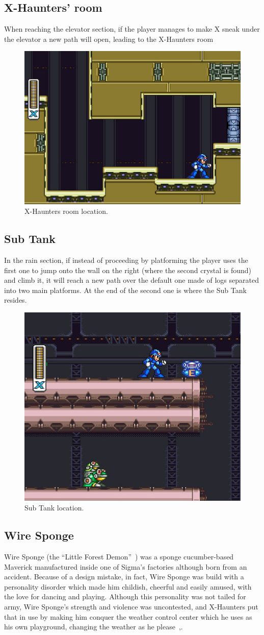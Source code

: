\subsection{X-Haunters' room}
When reaching the elevator section, if the player manages to make X sneak under the elevator a new path will open, leading to the X-Haunters room
\begin{figure}[htp]
	\centering
	\includegraphics[width=0.5\linewidth]{figures/X2/Wire_sponge/Sponge_haunter_room.jpg}
	\caption{X-Haunters room location.}
\end{figure}

\subsection{Sub Tank}
In the rain section, if instead of proceeding by platforming the player uses the first one to jump onto the wall on the right (where the second crystal is found) and climb it, it will reach a new path over the default one made of logs separated into two main platforms. At the end of the second one is where the Sub Tank resides.  
\begin{figure}[htp]
	\centering
	\includegraphics[width=0.5\linewidth]{figures/X2/Wire_sponge/Sponge_tank.jpg}
	\caption{Sub Tank location.}
\end{figure}

\subsection{Wire Sponge}\label{boss:Wire_sponge}
Wire Sponge (the ``Little Forest Demon''~\cite{book:MMX_Complete_art}) was a sponge cucumber-based Maverick manufactured inside one of Sigma's factories although born from an accident. Because of a design mistake, in fact, Wire Sponge was build with a personality disorder which made him childish, cheerful and easily amused, with the love for dancing and playing. Although this personality was not tailed for army, Wire Sponge's strength  and violence was uncontested, and X-Haunters put that in use by making him conquer the weather control center which he uses as his own playground, changing the weather as he please~\cite{wiki:wire_sponge},\cite{wayback:X2_resources}.

